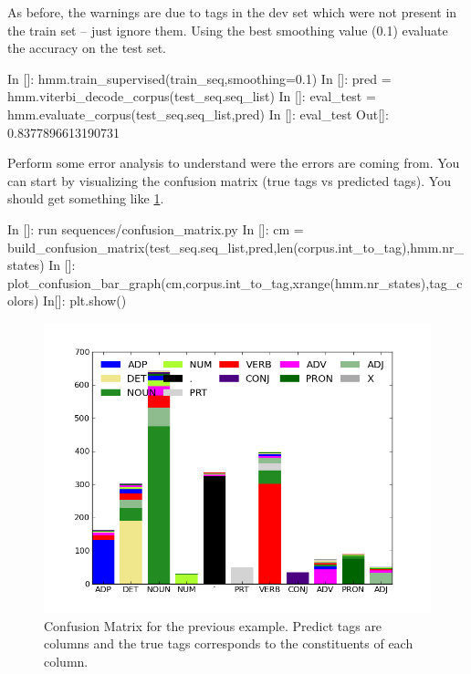 \begin{exercise}
As before, the warnings are due to tags in the dev set which were not present in the train set -- just ignore them. Using the best smoothing value (0.1) evaluate the accuracy on the test set.

\begin{python}
In []: hmm.train_supervised(train_seq,smoothing=0.1)
In []: pred = hmm.viterbi_decode_corpus(test_seq.seq_list)
In []: eval_test = hmm.evaluate_corpus(test_seq.seq_list,pred)
In []: eval_test
Out[]: 0.8377896613190731
\end{python}

Perform some error analysis to understand were the errors are coming
from. You can start by visualizing the confusion matrix (true tags vs
predicted tags). You should get something like \ref{fig:cm_uns}.

\begin{python}
In []: run sequences/confusion_matrix.py
In []: cm = build_confusion_matrix(test_seq.seq_list,pred,len(corpus.int_to_tag),hmm.nr_states)
In []: plot_confusion_bar_graph(cm,corpus.int_to_tag,xrange(hmm.nr_states),tag_colors)
In[]: plt.show()
\end{python}

\begin{figure}
\centering
\includegraphics[scale=.5]{figs/sequences/cm_sup.png}
\caption{\label{fig:cm_uns} Confusion Matrix for the previous
  example. Predict tags are columns and the true tags corresponds to
  the constituents of each column.}
\end{figure}

\end{exercise}



